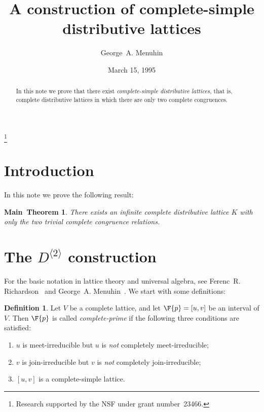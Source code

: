 \documentclass{amsart}
\theoremstyle{plain}
\newtheorem*{main}{Main~Theorem}
\theoremstyle{definition}
\newtheorem{definition}{Definition}
\theoremstyle{remark}
\numberwithin{equation}{section}
\newcommand{\fp}{\F{p}}%
\newcommand{\Ds}{D^{\langle2\rangle}}
\begin{document}
\title[Complete-simple distributive lattices]
      {A construction of complete-simple\\ 
       distributive lattices}
\author{George~A. Menuhin}
\address{Computer Science Department\\
         University of Winnebago\\
         Winnebago, Minnesota 23714} 
\thanks{Research supported by the NSF under grant number~23466.} 
\date{March 15, 1995}

\begin{abstract}
   In this note we prove that there exist \emph{complete-simple 
   distributive lattices,} that is, complete distributive 
   lattices in which there are only two complete congruences. 
\end{abstract}
\maketitle

\section{Introduction}\label{S:intro} 
In this note we prove the following result:

\begin{main}
   There exists an infinite complete distributive lattice 
   $K$ with only the two trivial complete congruence relations. 
\end{main}

\section{The $\Ds$ construction}\label{S:Ds}  
For the basic notation in lattice theory and universal algebra, 
see Ferenc~R. Richardson~\cite{fR82} and George~A. Menuhin~\cite{gM68}.  
We start with some definitions:

\begin{definition}\label{D:prime}
   Let $V$ be a complete lattice, and let $\fp = [u, v]$ be
   an interval of $V$.  Then $\fp$ is called 
   \emph{complete-prime} if the following three conditions are satisfied:
   \begin{enumerate}
      \item[(1)] $u$ is meet-irreducible but $u$ is \emph{not}
         completely meet-irreducible;
      \item[(2)] $v$ is join-irreducible but $v$ is \emph{not} 
         completely join-irreducible;
      \item[(3)] $[u, v]$ is a complete-simple lattice.
   \end{enumerate}
\end{definition}
\end{document}
